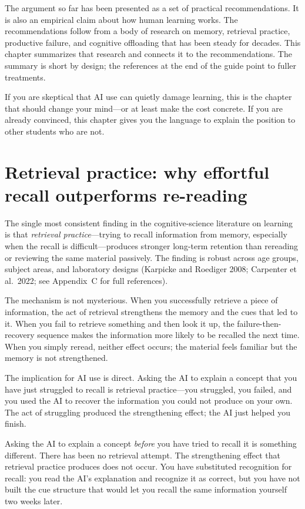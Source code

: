 \documentclass[11pt]{book}
\begin{document}
The argument so far has been presented as a set of practical recommendations. It is also an empirical claim about how human learning works. The recommendations follow from a body of research on memory, retrieval practice, productive failure, and cognitive offloading that has been steady for decades. This chapter summarizes that research and connects it to the recommendations. The summary is short by design; the references at the end of the guide point to fuller treatments.

If you are skeptical that AI use can quietly damage learning, this is the chapter that should change your mind---or at least make the cost concrete. If you are already convinced, this chapter gives you the language to explain the position to other students who are not.

\section{Retrieval practice: why effortful recall outperforms re-reading}

The single most consistent finding in the cognitive-science literature on learning is that \emph{retrieval practice}---trying to recall information from memory, especially when the recall is difficult---produces stronger long-term retention than rereading or reviewing the same material passively. The finding is robust across age groups, subject areas, and laboratory designs (Karpicke and Roediger 2008; Carpenter et al.\ 2022; see Appendix~C for full references).

The mechanism is not mysterious. When you successfully retrieve a piece of information, the act of retrieval strengthens the memory and the cues that led to it. When you fail to retrieve something and then look it up, the failure-then-recovery sequence makes the information more likely to be recalled the next time. When you simply reread, neither effect occurs; the material feels familiar but the memory is not strengthened.

The implication for AI use is direct. Asking the AI to explain a concept that you have just struggled to recall is retrieval practice---you struggled, you failed, and you used the AI to recover the information you could not produce on your own. The act of struggling produced the strengthening effect; the AI just helped you finish.

Asking the AI to explain a concept \emph{before} you have tried to recall it is something different. There has been no retrieval attempt. The strengthening effect that retrieval practice produces does not occur. You have substituted recognition for recall: you read the AI's explanation and recognize it as correct, but you have not built the cue structure that would let you recall the same information yourself two weeks later.
\end{document}
